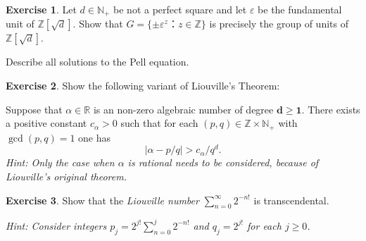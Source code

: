 \documentclass[12pt,a4paper]{article}
\theoremstyle{plain}
\newtheorem*{Sol*}{Solution}
\theoremstyle{definition}
\newtheorem{Ex}{Exercise}
\newif\ifsolutions
\newcommand{\exercise}[2]{
			\begin{Ex} #1 \end{Ex}
			\ifsolutions  \begin{Sol*} #2 \end{Sol*} \bigskip \else \bigskip  \fi
		}
\begin{document}
\exercise{ Let $d ∈ ℕ_+$ be not a perfect square and let $ε$ be the fundamental unit of $ℤ[\sqrt{d}]$. Show that $G = \{ \pm ε ^z ： z ∈ℤ\}$  is precisely the group of units of $ℤ[\sqrt{d}]$.

  \bigskip
  
  \noindent
  Describe all solutions to the Pell equation. 
}
{
	Let $\alpha = x + y\sqrt{d}$ be a unit of $Z[\sqrt{d}]$. We show that $\alpha$ belongs to $G$.

	We may write $x - y\sqrt{d}, -x + y\sqrt{d}$, and $-x - y\sqrt{d}$ as $\pm \alpha^{-1}$ and $-\alpha$, so that we may suppose $x, y \geq 0$.

	The case $x=1, y=0$ corresponds to $n=0$ in $G$, which lets us assume that $\alpha > 1$.

	There therefore exists an $n \geq 1$ such that
		\[ \epsilon^n \leq \alpha < \epsilon^{n+1}, \]
	by minimality of $\epsilon$.

	This means that $1 \leq \alpha \epsilon^{-n} < \alpha$. 
	By exercise 4ii), one must have $\alpha = \epsilon^n$, which concludes.
}



\exercise{
  Show the following variant of Liouville's Theorem:

  \bigskip 
  
  \noindent  
    Suppose that $α∈ ℝ$ is an non-zero algebraic number of degree $\mathbf{d ≥1}$. There exists a positive constant $c_α>0$ such that for each $(p,q) ∈ ℤ×ℕ_+$ with $\gcd(p,q) = 1$ one has
  \begin{displaymath}
    |α - p/q| > c_α/q^d. 
  \end{displaymath}
\smallskip 
\noindent 
\emph{Hint: Only the case when $α$ is rational needs to be considered, because of Liouville's original theorem.}
}{}


\exercise{Show that the \emph{Liouville number} $∑_{n=0}^{∞} 2^{-n!}$ is transcendental.

  \bigskip

\emph{Hint:   Consider integers  $p_j = 2^{j!} ∑_{n=0}^j 2^{-n!}$ and $q_j = 2^{j!}$ for each $j \geq 0$. }
  
}{}
  
\end{document}
